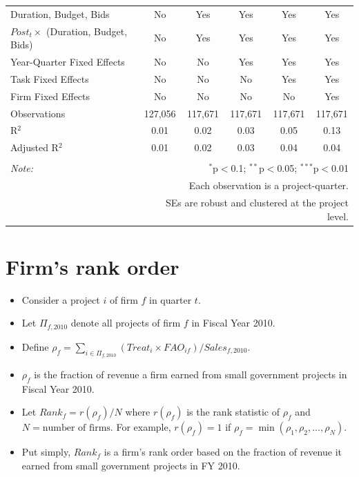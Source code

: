 \documentclass[
]{article}
\providecommand{\tightlist}{%
  \setlength{\itemsep}{0pt}\setlength{\parskip}{0pt}}
\begin{document}
\begin{table}[H]
\begin{tabular}{@{\extracolsep{-2pt}}lccccc}
Duration, Budget, Bids & No & Yes & Yes & Yes & Yes \\ 
$Post_t \times $  (Duration, Budget, Bids) & No & Yes & Yes & Yes & Yes \\ 
Year-Quarter Fixed Effects & No & No & Yes & Yes & Yes \\ 
Task Fixed Effects & No & No & No & Yes & Yes \\ 
Firm Fixed Effects & No & No & No & No & Yes \\ 
Observations & 127,056 & 117,671 & 117,671 & 117,671 & 117,671 \\ 
R$^{2}$ & 0.01 & 0.02 & 0.03 & 0.05 & 0.13 \\ 
Adjusted R$^{2}$ & 0.01 & 0.02 & 0.03 & 0.04 & 0.04 \\ 
\hline 
\hline \\[-1.8ex] 
\textit{Note:}  & \multicolumn{5}{r}{$^{*}$p$<$0.1; $^{**}$p$<$0.05; $^{***}$p$<$0.01} \\ 
 & \multicolumn{5}{r}{Each observation is a project-quarter.} \\ 
 & \multicolumn{5}{r}{SEs are robust and clustered at the project level.} \\ 
\end{tabular} 
\end{table}

\hypertarget{firms-rank-order}{%
\section{Firm's rank order}\label{firms-rank-order}}

\begin{itemize}
\tightlist
\item
  Consider a project \(i\) of firm \(f\) in quarter \(t\).
\item
  Let \(\Pi_{f,2010}\) denote all projects of firm \(f\) in Fiscal Year
  2010.
\item
  Define
  \(\rho_f = \sum_{i \in \Pi_{f,2010}} (Treat_i \times FAO_{if})/Sales_{f,\text{2010}}\).
\item
  \(\rho_f\) is the fraction of revenue a firm earned from small
  government projects in Fiscal Year 2010.
\item
  Let \(Rank_f = r(\rho_f)/N\) where \(r(\rho_f)\) is the rank statistic
  of \(\rho_{f}\) and \(N = \text{number of firms}.\) For example,
  \(r(\rho_f)=1\) if \(\rho_f=\min(\rho_1,\rho_2,\ldots,\rho_N)\).
\item
  Put simply, \(Rank_f\) is a firm's rank order based on the fraction of
  revenue it earned from small government projects in FY 2010.
\end{itemize}
\end{document}
